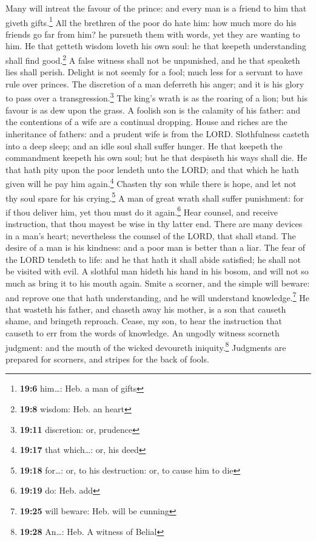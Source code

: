  Many will intreat the favour of the prince: and every man
is a friend to him that giveth gifts.\footnote{\textbf{19:6} him\ldots:
  Heb. a man of gifts}  All the brethren of the poor do
hate him: how much more do his friends go far from him? he pursueth them
with words, yet they are wanting to him.  He that getteth
wisdom loveth his own soul: he that keepeth understanding shall find
good.\footnote{\textbf{19:8} wisdom: Heb. an heart}  A
false witness shall not be unpunished, and he that speaketh lies shall
perish.  Delight is not seemly for a fool; much less for
a servant to have rule over princes.  The discretion of a
man deferreth his anger; and it is his glory to pass over a
transgression.\footnote{\textbf{19:11} discretion: or, prudence}
 The king's wrath is as the roaring of a lion; but his
favour is as dew upon the grass.  A foolish son is the
calamity of his father: and the contentions of a wife are a continual
dropping.  House and riches are the inheritance of
fathers: and a prudent wife is from the LORD. 
Slothfulness casteth into a deep sleep; and an idle soul shall suffer
hunger.  He that keepeth the commandment keepeth his own
soul; but he that despiseth his ways shall die.  He that
hath pity upon the poor lendeth unto the LORD; and that which he hath
given will he pay him again.\footnote{\textbf{19:17} that which\ldots:
  or, his deed}  Chasten thy son while there is hope, and
let not thy soul spare for his crying.\footnote{\textbf{19:18}
  for\ldots: or, to his destruction: or, to cause him to die}
 A man of great wrath shall suffer punishment: for if
thou deliver him, yet thou must do it again.\footnote{\textbf{19:19} do:
  Heb. add}  Hear counsel, and receive instruction, that
thou mayest be wise in thy latter end.  There are many
devices in a man's heart; nevertheless the counsel of the LORD, that
shall stand.  The desire of a man is his kindness: and a
poor man is better than a liar.  The fear of the LORD
tendeth to life: and he that hath it shall abide satisfied; he shall not
be visited with evil.  A slothful man hideth his hand in
his bosom, and will not so much as bring it to his mouth again.
 Smite a scorner, and the simple will beware: and reprove
one that hath understanding, and he will understand
knowledge.\footnote{\textbf{19:25} will beware: Heb. will be cunning}
 He that wasteth his father, and chaseth away his mother,
is a son that causeth shame, and bringeth reproach. 
Cease, my son, to hear the instruction that causeth to err from the
words of knowledge.  An ungodly witness scorneth
judgment: and the mouth of the wicked devoureth iniquity.\footnote{\textbf{19:28}
  An\ldots: Heb. A witness of Belial}  Judgments are
prepared for scorners, and stripes for the back of fools.

